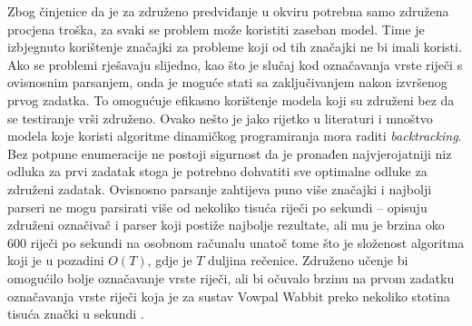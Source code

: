 Zbog činjenice da je za združeno predviđanje u \lts{} okviru potrebna samo
združena procjena troška, za svaki se problem može koristiti zaseban model. Time
je izbjegnuto korištenje značajki za probleme koji od tih značajki ne bi imali
koristi. Ako se problemi rješavaju slijedno, kao što je slučaj kod označavanja
vrste riječi s ovisnosnim parsanjem, onda je moguće stati sa zaključivanjem
nakon izvršenog prvog zadatka. To omogućuje efikasno korištenje modela koji su
združeni bez da se testiranje vrši združeno. Ovako nešto je jako rijetko u
literaturi i mnoštvo modela koje koristi algoritme dinamičkog programiranja mora
raditi \textit{backtracking}. Bez potpune enumeracije ne postoji sigurnost da je
pronađen najvjerojatniji niz odluka za prvi zadatak stoga je potrebno dohvatiti
sve optimalne odluke za združeni zadatak. Ovisnosno parsanje zahtijeva puno
više značajki i najbolji parseri ne mogu parsirati više od nekoliko tisuća
riječi po sekundi -- \citet{andor2016globally} opisuju združeni označivač i
parser koji postiže najbolje rezultate, ali mu je brzina oko 600 riječi po
sekundi na osobnom računalu unatoč tome što je složenost algoritma koji je u
pozadini $O(T)$, gdje je $T$ duljina rečenice. Združeno učenje bi omogućilo
bolje označavanje vrste riječi, ali bi očuvalo brzinu na prvom zadatku
označavanja vrste riječi koja je za sustav Vowpal Wabbit preko nekoliko stotina
tisuća znački u sekundi \citep{daume14lts}.

